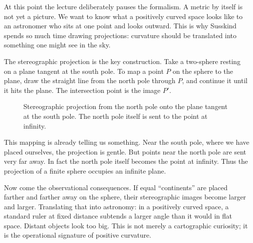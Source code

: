 At this point the lecture deliberately pauses the formalism. A metric by itself is not yet a picture. We want to know what a positively curved space looks like to an astronomer who sits at one point and looks outward. This is why Susskind spends so much time drawing projections: curvature should be translated into something one might see in the sky.

The stereographic projection is the key construction. Take a two-sphere resting on a plane tangent at the south pole. To map a point \(P\) on the sphere to the plane, draw the straight line from the north pole through \(P\), and continue it until it hits the plane. The intersection point is the image \(P'\).

\begin{figure}[htbp]
\centering
{}%
\caption{Stereographic projection from the north pole onto the plane tangent at the south pole. The north pole itself is sent to the point at infinity.}
\end{figure}

This mapping is already telling us something. Near the south pole, where we have placed ourselves, the projection is gentle. But points near the north pole are sent very far away. In fact the north pole itself becomes the point at infinity. Thus the projection of a finite sphere occupies an infinite plane.

Now come the observational consequences. If equal ``continents'' are placed farther and farther away on the sphere, their stereographic images become larger and larger. Translating that into astronomy: in a positively curved space, a standard ruler at fixed distance subtends a larger angle than it would in flat space. Distant objects look too big. This is not merely a cartographic curiosity; it is the operational signature of positive curvature.


